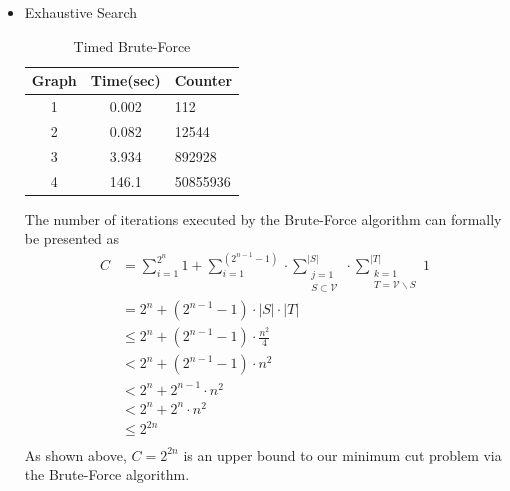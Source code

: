 \documentclass[longpaper, english, final, times]{revdetua}
\begin{document}
			\begin{itemize}
				\item Exhaustive Search
					\begin{table}[h]
						\caption{Timed Brute-Force}
						\label{table:timedbruteforce}
						\begin{center}					
						{\renewcommand{\arraystretch}{2}
							\begin{tabular}{|c|c|l|}
								\hline
								Graph& Time(sec) & Counter\\
								\hline
								1&0.002&112\\
								2&0.082&12544\\
								3&3.934&892928\\
								4&146.1&50855936\\
								\hline
							\end{tabular}
						}
						\end{center}
					\end{table}
					
					The number of iterations executed by the Brute-Force algorithm can formally be presented as 
					\begin{align*}
						C&=\sum_{i=1}^{2^n}1+\sum_{i=1}^{(2^{n-1}-1)}\cdot \sum\limits_{\substack{j=1 \\ S\subset \mathcal{V}}}^{|S|}\cdot 
						\sum\limits_{\substack{k=1 \\ T=\mathcal{V}\backslash S }}^{|T|} 1\\
						&=2^n+\left(2^{n-1}-1\right)\cdot |S|\cdot |T| \\
						&\le 2^n+\left(2^{n-1}-1\right)\cdot \frac{n^2}{4} \\
						&< 2^n+\left(2^{n-1}-1\right)\cdot n^2 \\
						&< 2^n+2^{n-1}\cdot n^2 \\
						&< 2^n+2^{n}\cdot n^2 \\
						&\le 2^{2n}\\
					\end{align*}
					As shown above, $C=2^{2n}$ is an upper bound to our minimum cut problem via the Brute-Force algorithm.
					

\end{itemize}
\end{document}
